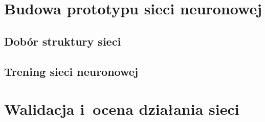 \section{Budowa prototypu sieci neuronowej}

\subsection{Dobór struktury sieci}

\subsection{Trening sieci neuronowej}

\section{Walidacja i~ocena działania sieci}
